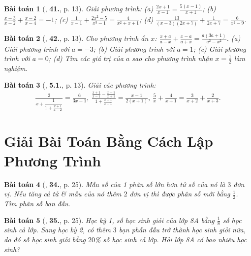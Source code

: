 \documentclass{article}
\numberwithin{equation}{section}
\newtheorem{baitoan}{Bài toán}
\begin{document}
\begin{baitoan}[\cite{SBT_Toan_8_tap_2}, \textbf{41.}, p. 13]
	Giải phương trình: (a) $\frac{2x + 1}{x - 1} = \frac{5(x - 1)}{x + 1}$; (b) $\frac{x - 3}{x - 2} + \frac{x - 2}{x - 4} = - 1$; (c) $\frac{1}{x - 1} + \frac{2x^2 - 5}{x^3 - 1} = \frac{4}{x^2 + x + 1}$; (d) $\frac{13}{(x - 3)(2x + 7)} + \frac{1}{2x + 7} = \frac{6}{x^2 - 9}$.
\end{baitoan}

\begin{baitoan}[\cite{SBT_Toan_8_tap_2}, \textbf{42.}, p. 13]
	Cho phương trình ẩn $x$: $\frac{x + a}{a - x} + \frac{x - a}{a + x} = \frac{a(3a + 1)}{a^2 - x^2}$. (a) Giải phương trình với $a = -3$; (b) Giải phương trình với $a = 1$; (c) Giải phương trình với $a = 0$; (d) Tìm các giá trị của $a$ sao cho phương trình nhận $x = \frac{1}{2}$ làm nghiệm.
\end{baitoan}

\begin{baitoan}[\cite{SBT_Toan_8_tap_2}, \textbf{5.1.}, p. 13]
	Giải các phương trình:
	\begin{align*}
		\frac{2}{x + \dfrac{1}{1 + \frac{x + 1}{x - 2}}} = \frac{6}{3x - 1},\ \frac{\frac{x + 1}{x - 1} - \frac{x - 1}{x + 1}}{1 + \frac{x + 1}{x - 1}} = \frac{x - 1}{2(x + 1)},\ \frac{5}{x} + \frac{4}{x + 1} = \frac{3}{x + 2} + \frac{2}{x + 3}.
	\end{align*}
\end{baitoan}


\section{Giải Bài Toán Bằng Cách Lập Phương Trình}

\begin{baitoan}[\cite{SGK_Toan_8_tap_2}, \textbf{34.}, p. 25]
	Mẫu số của 1 phân số lớn hơn tử số của nó là $3$ đơn vị. Nếu tăng cả tử \& mẫu của nó thêm $2$ đơn vị thì được phân số mới bằng $\frac{1}{2}$. Tìm phân số ban đầu.
\end{baitoan}

\begin{baitoan}[\cite{SGK_Toan_8_tap_2}, \textbf{35.}, p. 25]
	Học kỳ 1, số học sinh giỏi của lớp 8A bằng $\frac{1}{8}$ số học sinh cả lớp. Sang học kỳ 2, có thêm $3$ bạn phấn đấu trở thành học sinh giỏi nữa, do đó số học sinh giỏi bằng $20$\% số học sinh cả lớp. Hỏi lớp 8A có bao nhiêu học sinh?
\end{baitoan}
\end{document}
